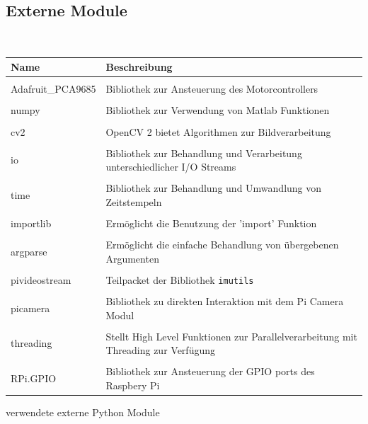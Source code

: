   \subsection{Externe Module}
  \ \\
  \begin{minipage}{\columnwidth}
    \makeatletter
    \def\@captype{table}
    \makeatother
    \centering
    \begin{tabular}{p{3.5cm}|p{11cm}}
    Name & Beschreibung \\ \hline \hline
      & \\
    Adafruit\_PCA9685 & Bibliothek zur Ansteuerung des Motorcontrollers \\
      & \\
    numpy & Bibliothek zur Verwendung von Matlab Funktionen \\
      & \\
    cv2 & OpenCV 2 bietet Algorithmen zur Bildverarbeitung \\
      & \\
    io & Bibliothek zur Behandlung und Verarbeitung unterschiedlicher I/O Streams\\
      & \\
    time & Bibliothek zur Behandlung und Umwandlung von Zeitstempeln \\
      & \\
    importlib & Ermöglicht die Benutzung der 'import' Funktion \\
      & \\
    argparse & Ermöglicht die einfache Behandlung von übergebenen Argumenten\\
      & \\
    pivideostream & Teilpacket der Bibliothek \texttt{imutils}\\
      & \\
    picamera & Bibliothek zu direkten Interaktion mit dem Pi Camera Modul \\
      & \\
    threading & Stellt High Level Funktionen zur Parallelverarbeitung mit Threading zur Verfügung \\
      & \\
    RPi.GPIO & Bibliothek zur Ansteuerung der GPIO ports des Raspbery Pi \\
    \end{tabular}
    \caption{verwendete externe Python Module}
    \label{tab:01}
  \end{minipage}
  
